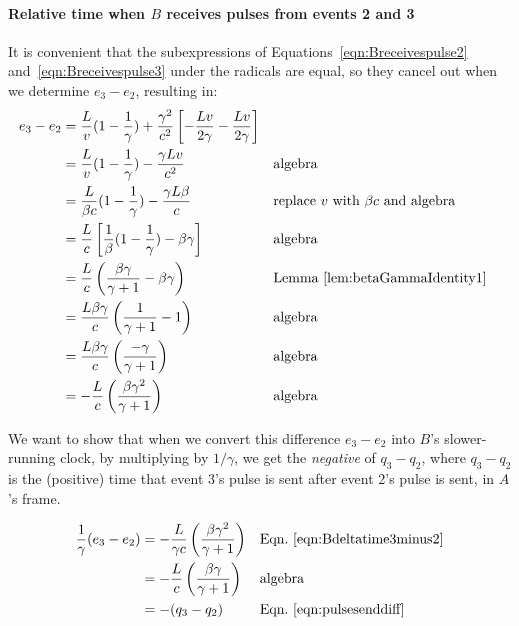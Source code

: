 \documentclass[a4paper]{article}
\theoremstyle{plain}
\theoremstyle{definition}
\begin{document}
\paragraph{Relative time when $B$ receives pulses from events 2 and 3}

It is convenient that the subexpressions of
Equations~\eqref{eqn:Breceivespulse2} and~\eqref{eqn:Breceivespulse3}
under the radicals are equal, so they cancel out when we determine
$e_3 - e_2$, resulting in:
\begin{align}
e_3 - e_2
  & = \frac{L}{v}(1-\frac{1}{\gamma}) + \frac{\gamma^2}{c^2} \left[ -\frac{Lv}{2 \gamma} - \frac{Lv}{2 \gamma} \right] \nonumber \\
  & = \frac{L}{v}(1-\frac{1}{\gamma}) - \frac{\gamma Lv}{c^2} & & \text{algebra} \nonumber \\
  & = \frac{L}{\beta c}(1-\frac{1}{\gamma}) - \frac{\gamma L\beta}{c} & & \text{replace $v$ with $\beta c$ and algebra} \nonumber \\
  & = \frac{L}{c} \left[ \frac{1}{\beta}(1-\frac{1}{\gamma}) - \beta \gamma \right] & & \text{algebra} \nonumber \\
  & = \frac{L}{c} \left( \frac{\beta\gamma}{\gamma+1} - \beta \gamma \right) & & \text{Lemma~\ref{lem:betaGammaIdentity1}} \nonumber \\
  & = \frac{L\beta\gamma}{c} \left( \frac{1}{\gamma+1} - 1 \right) & & \text{algebra} \nonumber \\
  & = \frac{L\beta\gamma}{c} \left( \frac{-\gamma}{\gamma+1} \right) & & \text{algebra} \nonumber \\
  & = - \frac{L}{c} \left( \frac{\beta\gamma^2}{\gamma+1} \right) & & \text{algebra} \label{eqn:Bdeltatime3minus2}
\end{align}

We want to show that when we convert this difference $e_3 - e_2$ into
$B$'s slower-running clock, by multiplying by $1/\gamma$, we get the
{\em negative} of $q_3 - q_2$, where $q_3 - q_2$ is the (positive)
time that event 3's pulse is sent after event 2's pulse is sent, in
$A$'s frame.

\begin{align*}
\frac{1}{\gamma}(e_3 - e_2)
  & = - \frac{L}{\gamma c} \left( \frac{\beta\gamma^2}{\gamma+1} \right) & & \text{Eqn.~\eqref{eqn:Bdeltatime3minus2}} \\
  & = - \frac{L}{c} \left( \frac{\beta\gamma}{\gamma+1} \right) & & \text{algebra} \\
  & = - (q_3 - q_2) & & \text{Eqn.~\eqref{eqn:pulsesenddiff}}
\end{align*}
\end{document}
